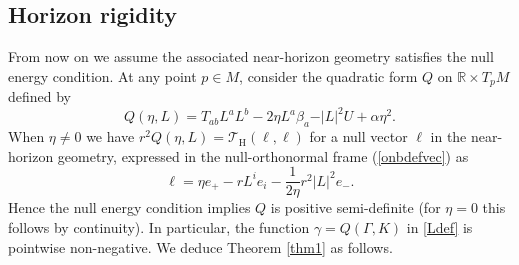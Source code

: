 \documentclass[11pt, reqno]{amsart}
\newcommand{\R}{\mathbb{R}}
\theoremstyle{plain}
\theoremstyle{definition}
\numberwithin{equation}{section}
\begin{document}
\subsection{Horizon rigidity} From now on we assume the associated near-horizon geometry satisfies the null energy condition. At any point $p \in M$, consider the quadratic form $Q$ on $\R \times T_pM$ defined by
\begin{equation}
    Q(\eta, L) = T_{ab}L^aL^b - 2\eta L^a\beta_a - \vert L \vert^2U + \alpha\eta^2.
\end{equation}
When $\eta \neq 0$ we have $r^2Q(\eta,L) = \mathcal{T}_\text{H}(\ell, \ell)$ for a null vector $\ell$ in the near-horizon geometry, expressed in the null-orthonormal frame (\ref{onbdefvec}) as
\begin{equation} \label{ell}
    \ell= \eta e_+ - r L^ie_i - \frac{1}{2\eta}r^2\vert L\vert^2e_-.
\end{equation}
Hence the null energy condition implies $Q$ is positive semi-definite (for $\eta = 0$ this follows by continuity). In particular, the function $\gamma = Q(\Gamma,K)$ in \eqref{Ldef} is pointwise non-negative. We deduce Theorem \ref{thm1} as follows.
\end{document}
